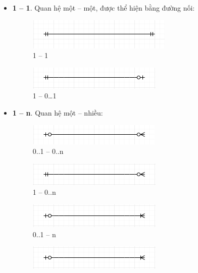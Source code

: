 \documentclass{article}
\begin{document}
  \begin{itemize}
    \item \textbf{1 -- 1}. Quan hệ một -- một, được thể hiện bằng đường nối:
    \begin{figure}[!ht]
      \centering
      \includegraphics[scale=0.8]{../pictures/diagrams/entityrelationship/1to1.PNG}
      \caption{1 -- 1}
    \end{figure}
    \begin{figure}[!ht]
      \centering
      \includegraphics[scale=0.8]{../pictures/diagrams/entityrelationship/1-mandatory-to-1-optional.PNG}
      \caption{1 -- 0\ldots 1}
    \end{figure}
    \item \textbf{1 -- n}. Quan hệ một -- nhiều:
    \begin{figure}[!ht]
      \centering
      \includegraphics[scale=0.8]{../pictures/diagrams/entityrelationship/1-optional-to-Many-optional.PNG}
      \caption{0..1 -- 0..n}
    \end{figure}
    \begin{figure}[!ht]
      \centering
      \includegraphics[scale=0.8]{../pictures/diagrams/entityrelationship/1-mandatory-to-Many-optional.PNG}
      \caption{1 -- 0..n}
    \end{figure}
    \begin{figure}[!ht]
      \centering
      \includegraphics[scale=0.8]{../pictures/diagrams/entityrelationship/1-optional-to-Many-mandatory.PNG}
      \caption{0..1 -- n}
    \end{figure}
    \begin{figure}[!ht]
      \centering
      \includegraphics[scale=0.8]{../pictures/diagrams/entityrelationship/1-optional-to-Many-mandatory.PNG}

\end{figure}
\end{itemize}
\end{document}
